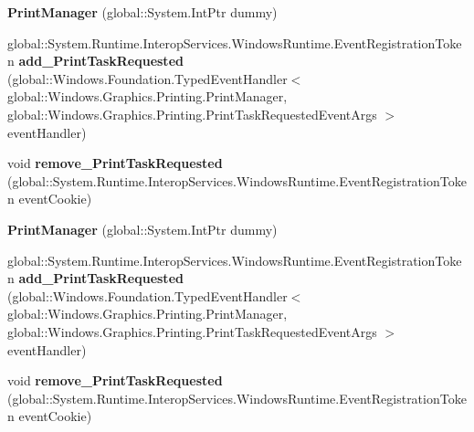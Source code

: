 \begin{DoxyCompactItemize}
\item 
\mbox{\label{class_windows_1_1_graphics_1_1_printing_1_1_print_manager_ac3534eb55e14156385c81406eb48acd4}} 
{\bfseries Print\+Manager} (global\+::\+System.\+Int\+Ptr dummy)
\item 
\mbox{\label{class_windows_1_1_graphics_1_1_printing_1_1_print_manager_ad4f9319fbeb60847591b14fbe244a321}} 
global\+::\+System.\+Runtime.\+Interop\+Services.\+Windows\+Runtime.\+Event\+Registration\+Token {\bfseries add\+\_\+\+Print\+Task\+Requested} (global\+::\+Windows.\+Foundation.\+Typed\+Event\+Handler$<$ global\+::\+Windows.\+Graphics.\+Printing.\+Print\+Manager, global\+::\+Windows.\+Graphics.\+Printing.\+Print\+Task\+Requested\+Event\+Args $>$ event\+Handler)
\item 
\mbox{\label{class_windows_1_1_graphics_1_1_printing_1_1_print_manager_af794d7bfcf46b47b3e0cfaf0e7d3e154}} 
void {\bfseries remove\+\_\+\+Print\+Task\+Requested} (global\+::\+System.\+Runtime.\+Interop\+Services.\+Windows\+Runtime.\+Event\+Registration\+Token event\+Cookie)
\item 
\mbox{\label{class_windows_1_1_graphics_1_1_printing_1_1_print_manager_ac3534eb55e14156385c81406eb48acd4}} 
{\bfseries Print\+Manager} (global\+::\+System.\+Int\+Ptr dummy)
\item 
\mbox{\label{class_windows_1_1_graphics_1_1_printing_1_1_print_manager_ad4f9319fbeb60847591b14fbe244a321}} 
global\+::\+System.\+Runtime.\+Interop\+Services.\+Windows\+Runtime.\+Event\+Registration\+Token {\bfseries add\+\_\+\+Print\+Task\+Requested} (global\+::\+Windows.\+Foundation.\+Typed\+Event\+Handler$<$ global\+::\+Windows.\+Graphics.\+Printing.\+Print\+Manager, global\+::\+Windows.\+Graphics.\+Printing.\+Print\+Task\+Requested\+Event\+Args $>$ event\+Handler)
\item 
\mbox{\label{class_windows_1_1_graphics_1_1_printing_1_1_print_manager_af794d7bfcf46b47b3e0cfaf0e7d3e154}} 
void {\bfseries remove\+\_\+\+Print\+Task\+Requested} (global\+::\+System.\+Runtime.\+Interop\+Services.\+Windows\+Runtime.\+Event\+Registration\+Token event\+Cookie)

\end{DoxyCompactItemize}
